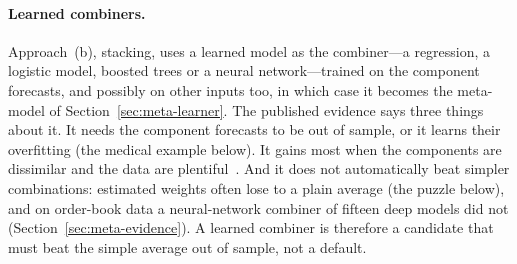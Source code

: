 \paragraph{Learned combiners.} Approach~(b), stacking, uses a learned model as the combiner---a regression, a logistic model, boosted trees or a neural network---trained on the
component forecasts, and possibly on other inputs too, in which case it becomes the meta-model of
Section~\ref{sec:meta-learner}. The published evidence says three things about it. It needs the component
forecasts to be out of sample, or it learns their overfitting (the medical example below). It gains most
when the components are dissimilar and the data are plentiful~\citep{breiman1996stack,ting1999}. And it does
not automatically beat simpler combinations: estimated weights often lose to a plain average (the puzzle
below), and on order-book data a neural-network combiner of fifteen deep models did not
(Section~\ref{sec:meta-evidence}). A learned combiner is therefore a candidate that must beat the simple average out of
sample, not a default.

